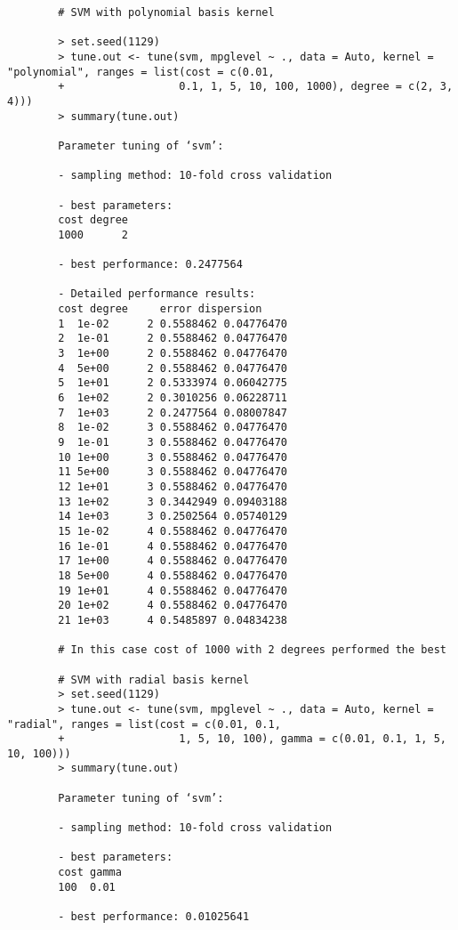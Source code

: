 \documentclass{article}
\begin{document}
	\begin{verbatim}
		# SVM with polynomial basis kernel
		
		> set.seed(1129)
		> tune.out <- tune(svm, mpglevel ~ ., data = Auto, kernel = "polynomial", ranges = list(cost = c(0.01, 
		+                  0.1, 1, 5, 10, 100, 1000), degree = c(2, 3, 4)))
		> summary(tune.out)
		
		Parameter tuning of ‘svm’:
		
		- sampling method: 10-fold cross validation 
		
		- best parameters:
		cost degree
		1000      2
		
		- best performance: 0.2477564 
		
		- Detailed performance results:
		cost degree     error dispersion
		1  1e-02      2 0.5588462 0.04776470
		2  1e-01      2 0.5588462 0.04776470
		3  1e+00      2 0.5588462 0.04776470
		4  5e+00      2 0.5588462 0.04776470
		5  1e+01      2 0.5333974 0.06042775
		6  1e+02      2 0.3010256 0.06228711
		7  1e+03      2 0.2477564 0.08007847
		8  1e-02      3 0.5588462 0.04776470
		9  1e-01      3 0.5588462 0.04776470
		10 1e+00      3 0.5588462 0.04776470
		11 5e+00      3 0.5588462 0.04776470
		12 1e+01      3 0.5588462 0.04776470
		13 1e+02      3 0.3442949 0.09403188
		14 1e+03      3 0.2502564 0.05740129
		15 1e-02      4 0.5588462 0.04776470
		16 1e-01      4 0.5588462 0.04776470
		17 1e+00      4 0.5588462 0.04776470
		18 5e+00      4 0.5588462 0.04776470
		19 1e+01      4 0.5588462 0.04776470
		20 1e+02      4 0.5588462 0.04776470
		21 1e+03      4 0.5485897 0.04834238
		
		# In this case cost of 1000 with 2 degrees performed the best
		
		# SVM with radial basis kernel
		> set.seed(1129)
		> tune.out <- tune(svm, mpglevel ~ ., data = Auto, kernel = "radial", ranges = list(cost = c(0.01, 0.1,
		+                  1, 5, 10, 100), gamma = c(0.01, 0.1, 1, 5, 10, 100)))
		> summary(tune.out)
		
		Parameter tuning of ‘svm’:
		
		- sampling method: 10-fold cross validation 
		
		- best parameters:
		cost gamma
		100  0.01
		
		- best performance: 0.01025641 
		

\end{verbatim}
\end{document}
